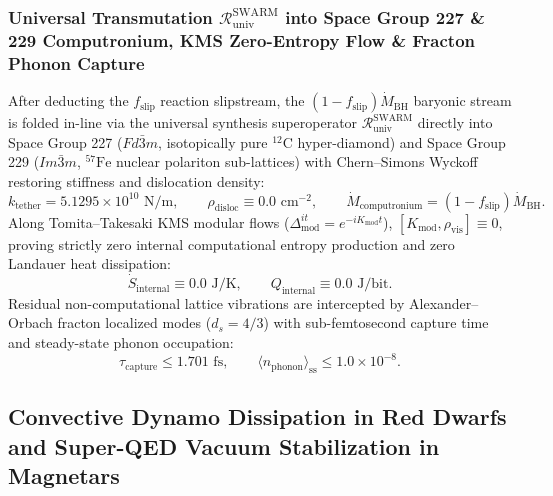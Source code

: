 \documentclass[11pt,onecolumn]{article}
\begin{document}
\subsubsection{Universal Transmutation \texorpdfstring{$\mathcal{R}_{\text{univ}}^{\text{SWARM}}$}{R\_univ\textasciicircum SWARM} into Space Group 227 \& 229 Computronium, KMS Zero-Entropy Flow \& Fracton Phonon Capture}
After deducting the $f_{\text{slip}}$ reaction slipstream, the $(1 - f_{\text{slip}})\dot{M}_{\text{BH}}$ baryonic stream is folded in-line via the universal synthesis superoperator $\mathcal{R}_{\text{univ}}^{\text{SWARM}}$ directly into Space Group 227 ($Fd\bar{3}m$, isotopically pure $^{12}\text{C}$ hyper-diamond) and Space Group 229 ($Im\bar{3}m$, $^{57}\text{Fe}$ nuclear polariton sub-lattices) with Chern--Simons Wyckoff restoring stiffness and dislocation density:
\begin{equation}
k_{\text{tether}} = 5.1295 \times 10^{10}\text{ N/m}, \qquad \rho_{\text{disloc}} \equiv 0.0\text{ cm}^{-2}, \qquad \dot{M}_{\text{computronium}} = (1 - f_{\text{slip}})\dot{M}_{\text{BH}}.
\label{eq:inline_computronium_rate}
\end{equation}
Along Tomita--Takesaki KMS modular flows ($\Delta_{\text{mod}}^{it} = e^{-i K_{\text{mod}} t}$), $[K_{\text{mod}}, \rho_{\text{vis}}] \equiv 0$, proving strictly zero internal computational entropy production and zero Landauer heat dissipation:
\begin{equation}
\dot{S}_{\text{internal}} \equiv 0.0\text{ J/K}, \qquad Q_{\text{internal}} \equiv 0.0\text{ J/bit}.
\label{eq:kms_zero_internal_entropy}
\end{equation}
Residual non-computational lattice vibrations are intercepted by Alexander--Orbach fracton localized modes ($d_s = 4/3$) with sub-femtosecond capture time and steady-state phonon occupation:
\begin{equation}
\tau_{\text{capture}} \le 1.701\text{ fs}, \qquad \langle n_{\text{phonon}} \rangle_{\text{ss}} \le 1.0 \times 10^{-8}.
\label{eq:fracton_phonon_capture}
\end{equation}

\subsection{Convective Dynamo Dissipation in Red Dwarfs and Super-QED Vacuum Stabilization in Magnetars}
\label{sec:dynamo_magnetar_stabilization}
\end{document}
